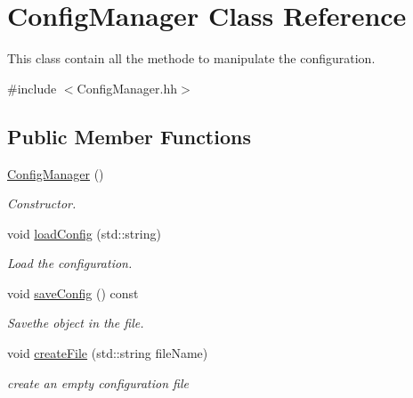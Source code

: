 \hypertarget{classConfigManager}{}\section{Config\+Manager Class Reference}
\label{classConfigManager}


This class contain all the methode to manipulate the configuration.  




{\ttfamily \#include $<$Config\+Manager.\+hh$>$}

\subsection*{Public Member Functions}
\begin{DoxyCompactItemize}
\item 
\mbox{\label{classConfigManager_a7d3d7c10423d969f7544509f6fcca32f}} 
\hyperlink{classConfigManager_a7d3d7c10423d969f7544509f6fcca32f}{Config\+Manager} ()
\begin{DoxyCompactList}\small\item\em Constructor. \end{DoxyCompactList}\item 
void \hyperlink{classConfigManager_a63ff6c831f037cf5bfe580b4944b0b6c}{load\+Config} (std\+::string)
\begin{DoxyCompactList}\small\item\em Load the configuration. \end{DoxyCompactList}\item 
\mbox{\label{classConfigManager_a178e051860792271e9b1ec4434776f91}} 
void \hyperlink{classConfigManager_a178e051860792271e9b1ec4434776f91}{save\+Config} () const
\begin{DoxyCompactList}\small\item\em Savethe object in the file. \end{DoxyCompactList}\item 
void \hyperlink{classConfigManager_af78f80706b5a300a738c3fde04c9c91b}{create\+File} (std\+::string file\+Name)
\begin{DoxyCompactList}\small\item\em create an empty configuration file \end{DoxyCompactList}\end{DoxyCompactItemize}
